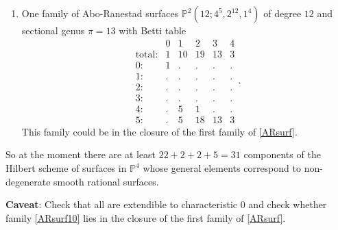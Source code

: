 \documentclass[twoside,12pt, leqno]{amsart}
\def\PP{{\mathbb P}}
\begin{document}
\begin{enumerate}
\item\label{ARsurf10} One family of Abo-Ranestad surfaces $\PP^{2}(12;4^{5},2^{12},1^{4})$ of degree $12$ and sectional genus $\pi=13$ with Betti table
$$
\begin{matrix}
       & 0 & 1 & 2 & 3 & 4\\
      \text{total:} & 1 & 10 & 19 & 13 & 3\\
      0: & 1 & . & . & . & .\\
      1: & . & . & . & . & .\\
      2: & . & . & . & . & .\\
      3: & . & . & . & . & .\\
      4: & . & 5 & 1 & . & .\\
      5: & . & 5 & 18 & 13 & 3
      \end{matrix}.$$
This family could be in the closure of the first family of \ref{ARsurf}.
\end{enumerate}

So at the moment there are at least $22+2+2+5=31$ components of the Hilbert scheme of surfaces in $\PP^{4}$ whose general elements correspond to non-degenerate  smooth rational surfaces.

{\bf Caveat}: Check that all are extendible to characteristic 0 and check whether family \ref{ARsurf10} lies in the closure of the first family of \ref{ARsurf}.
\end{document}
